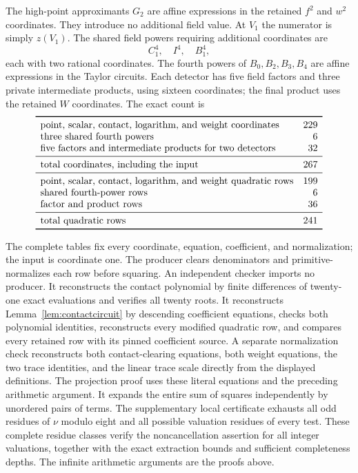 \documentclass[11pt,a4paper]{article}
\begin{document}
The high-point approximants $G_2$ are affine expressions in the
retained $f^2$ and $w^2$ coordinates. They introduce no additional
field value. At $V_1$ the numerator is simply $z(V_1)$.
The shared field powers requiring additional coordinates are
\[
                              C_1^4,\quad I^4,\quad B_1^4,
\]
each with two rational coordinates. The fourth powers of
$B_0,B_2,B_3,B_4$ are affine expressions in the Taylor circuits.
Each detector has five field factors and three private intermediate
products, using sixteen coordinates; the final product uses the
retained $W$ coordinates. The exact count is
\[
\begin{array}{lr}\toprule
\text{point, scalar, contact, logarithm, and weight coordinates}&229\\
\text{three shared fourth powers}&6\\
\text{five factors and intermediate products for two detectors}&32\\\midrule
\text{total coordinates, including the input}&267\\\midrule
\text{point, scalar, contact, logarithm, and weight quadratic rows}&199\\
\text{shared fourth-power rows}&6\\
\text{factor and product rows}&36\\\midrule
\text{total quadratic rows}&241\\\bottomrule
\end{array}
\]

The complete tables fix every coordinate, equation, coefficient, and
normalization; the input is coordinate one. The producer clears
denominators and primitive-normalizes each row before squaring.
An independent checker imports no producer. It reconstructs the
contact polynomial by finite differences of twenty-one exact
evaluations and verifies all twenty roots. It reconstructs
Lemma~\ref{lem:contactcircuit} by descending coefficient equations,
checks both polynomial identities, reconstructs every modified
quadratic row, and compares every retained row with its pinned coefficient
source. A separate normalization check reconstructs both contact-clearing
equations, both weight equations, the two trace identities, and the
linear trace scale directly from the displayed definitions. The
projection proof uses these literal equations and the preceding
arithmetic argument.
It expands the entire sum of squares independently by unordered
pairs of terms. The supplementary local certificate exhausts all
odd residues of $\nu$ modulo eight and all possible valuation residues
of every test. These complete residue classes verify the
noncancellation assertion for all integer valuations, together with
the exact extraction bounds and sufficient completeness depths.
The infinite arithmetic arguments are the proofs above.
\end{document}
